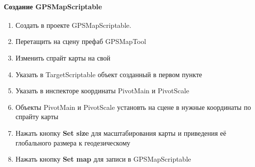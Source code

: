 \documentclass[a4paper, 11pt, titlepage]{article}
\begin{document}
        \paragraph{Создание GPSMapScriptable}
          \begin{enumerate}
            \item Создать в проекте GPSMapScriptable.
            \item Перетащить на сцену префаб GPSMapTool
            \item Изменить спрайт карты на свой
            \item Указать в TargetScriptable объект созданный в первом пункте
            \item Указать в инспекторе координаты PivotMain и PivotScale
            \item Объекты PivotMain и PivotScale установть на сцене в нужные координаты по спрайту карты 
            \item Нажать кнопку \textbf{Set size} для масштабирования карты и приведения её глобального размера к геодезическому
            \item Нажать кнопку \textbf{Set map} для записи в GPSMapScriptable
          \end{enumerate}
\end{document}
